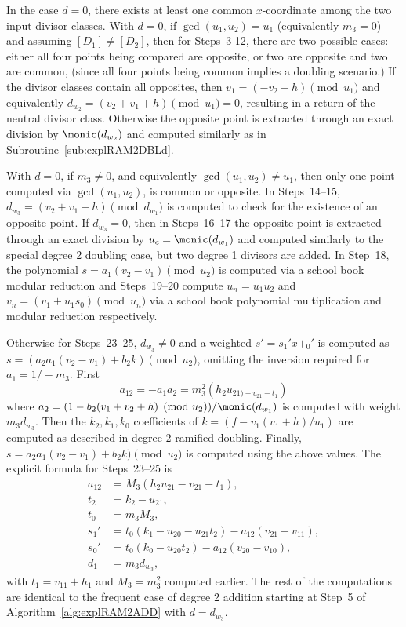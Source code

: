 In the case $d = 0$, there exists at least one common $x$-coordinate among the
two input divisor classes. With $d=0$, if $\gcd(u_1,u_2) = u_1$ (equivalently
$m_3 = 0$) and assuming $[D_1] \not = [D_2]$, then for Steps~3-12, there are two
possible cases: either all four points being compared are opposite, or two are
opposite and two are common, (since all four points being common implies a
doubling scenario.) If the divisor classes contain all opposites, then $v_1 =
(-v_2 -h) \pmod{u_1}$ and equivalently $d_{w_2} = (v_2 + v_1 + h) \pmod{u_1} =
0$, resulting in a return of the neutral divisor class. Otherwise the opposite
point is extracted through an exact division by $\monic(d_{w_2})$ and computed
similarly as in Subroutine~\ref{sub:explRAM2DBLd}.

With $d=0$, if $m_3 \neq 0$, and equivalently $\gcd(u_1,u_2) \neq u_1$, then
only one point computed via $\gcd(u_1,u_2)$, is common or opposite. In
Steps~14--15, $d_{w_3} = (v_2 + v_1 + h) \pmod{d_{w_1}}$ is computed to check
for the existence of an opposite point. If $d_{w_3} = 0$, then in Steps~16--17
the opposite point is extracted through an exact division by $u_c =
\monic(d_{w_1})$ and computed similarly to the special degree 2 doubling case,
but two degree 1 divisors are added. In Step~18, the polynomial $s = a_1(v_2 -
v_1) \pmod{u_2}$ is computed via a school book modular reduction and
Steps~19--20 compute $u_n = u_1u_2$ and $v_n = (v_1 + u_1s_0) \pmod{u_n}$  via a
school book polynomial multiplication and modular reduction respectively. 

Otherwise for Steps~23--25, $d_{w_3} \neq 0$ and  a weighted $s' = s_1'x + _0'$
is computed as $s = (a_2a_1(v_2 - v_1) + b_2k) \pmod{u_2}$, omitting the
inversion required for $a_1 = 1/-m_3$. First
$$a_{12} = -a_1a_2 = m_3^2(h_2u_{21) - v_{21} - t_1})$$ where $a_2 = (1 -
b_2(v_1 + v_2 + h) \pmod{u_2})/\monic(d_{w_1})$ is computed with weight
$m_3d_{w_3}$. Then the $k_2,k_1,k_0$ coefficients of $k = (f - v_1(v_1 +
h)/u_1)$ are computed as described in degree 2 ramified doubling. Finally, $s =
a_2a_1(v_2 - v_1)+ b_2k) \pmod{u_2}$ is computed using the above values. The
explicit formula for Steps~23--25 is
\begin{align*}
    a_{12} &= M_3(h_2u_{21} - v_{21} - t_1),\\   
    t_2 &= k_2 - u_{21},\\
    t_0 &= m_3M_3,\\
    s_1' &= t_0(k_1 - u_{20} - u_{21}t_2) - a_{12}(v_{21} - v_{11}),\\
    s_0' &= t_0(k_0 - u_{20}t_2) - a_{12}(v_{20} - v_{10}),\\
    d_1 &= m_3d_{w_3},
\end{align*} with $t_1 = v_{11} + h_1$ and $M_3 = m_3^2$ computed earlier. The 
rest of the computations are identical to the frequent case of degree 2 addition
starting at Step~5 of Algorithm~\ref{alg:explRAM2ADD} with $d = d_{w_3}$.

